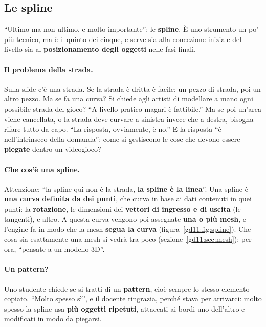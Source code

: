 \subsection{Le spline}
\label{gd11:sec:spline}

``Ultimo ma non ultimo, e molto importante'': le \textbf{spline}. È uno
strumento un po' più tecnico, ma è il quinto dei cinque, e serve sia alla
concezione iniziale del livello sia al \textbf{posizionamento degli oggetti}
nelle fasi finali.

\paragraph{Il problema della strada.} Sulla slide c'è una strada. Se la strada è
dritta è facile: un pezzo di strada, poi un altro pezzo. Ma se fa una curva?
Si chiede agli artisti di modellare a mano ogni possibile strada del gioco? ``A
livello pratico magari è fattibile.'' Ma se poi un'area viene cancellata, o la
strada deve curvare a sinistra invece che a destra, bisogna rifare tutto da
capo. ``La risposta, ovviamente, è no.'' E la risposta ``è nell'intrinseco della
domanda'': come si gestiscono le cose che devono essere \textbf{piegate} dentro
un videogioco?

\paragraph{Che cos'è una spline.} Attenzione: ``la spline qui non è la strada,
\textbf{la spline è la linea}''. Una spline è \textbf{una curva definita da dei
punti}, che curva in base ai dati contenuti in quei punti: la
\textbf{rotazione}, le dimensioni dei \textbf{vettori di ingresso e di uscita}
(le tangenti), e altro. A questa curva vengono poi assegnate \textbf{una o più
mesh}, e l'engine fa in modo che la mesh \textbf{segua la curva}
(figura~\ref{gd11:fig:spline}). Che cosa sia esattamente una mesh si vedrà tra
poco (sezione~\ref{gd11:sec:mesh}); per ora, ``pensate a un modello 3D''.

\paragraph{Un pattern?} Uno studente chiede se si tratti di un
\textbf{pattern}, cioè sempre lo stesso elemento copiato. ``Molto spesso sì'', e
il docente ringrazia, perché stava per arrivarci: molto spesso la spline usa
\textbf{più oggetti ripetuti}, attaccati ai bordi uno dell'altro e modificati in
modo da piegarsi.

